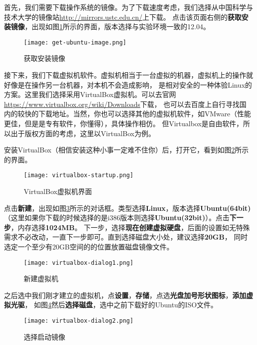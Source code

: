 首先，我们需要下载操作系统的镜像。为了下载速度考虑，我们选择从中国科学与技术大学的镜像站\url{http://mirrors.ustc.edu.cn/}上下载。
点击该页面右侧的\textbf{获取安装镜像}，出现如图\ref{fig:get-ubuntu-image}所示的界面，版本选择与实验环境一致的12.04。

\begin{figure}[htbp]
  \centering
  \texttt{[image: get-ubuntu-image.png]}
  \caption{获取安装镜像}\label{fig:get-ubuntu-image}
\end{figure}

接下来，我们下载虚拟机软件。虚拟机相当于一台虚拟的机器，虚拟机上的操作就好像是在操作另一台机器，对本机不会造成影响，
是相对安全的一种体验Linux的方案。这里我们选择采用VirtualBox虚拟机。可以去官网\url{https://www.virtualbox.org/wiki/Downloads}下载，
也可以去百度上自行寻找国内的较快的下载地址。当然，你也可以选择其他的虚拟机软件，如VMware（性能更佳，但是是专有软件，你懂得），具体操作相仿。
但Virtualbox是自由软件，所以出于版权方面的考虑，这里以VirtualBox为例。

安装VirtualBox（相信安装这种小事一定难不住你）后，打开它，看到如图\ref{fig:virtualbox-startup}所示的界面。

\begin{figure}[htbp]
  \centering
  \texttt{[image: virtualbox-startup.png]}
  \caption{VirtualBox虚拟机界面}\label{fig:virtualbox-startup}
\end{figure}

点击\textbf{新建}，出现如图\ref{fig:virtualbox-dialog1}所示的对话框。类型选择\textbf{Linux}，版本选择\textbf{Ubuntu(64bit)}
（这里如果你下载的时候选择的是i386版本则选择\textbf{Ubuntu(32bit)}）。点击\textbf{下一步}，内存选择\textbf{1024MB}。
下一步，选择\textbf{现在创建虚拟硬盘}，后面的设置如无特殊需求不必改动，一直下一步即可。直到选择磁盘大小处，建议选择\textbf{20GB}，
同时选定一个至少有20GB空间的的位置放置磁盘镜像文件。

\begin{figure}[htbp]
  \centering
  \texttt{[image: virtualbox-dialog1.png]}
  \caption{新建虚拟机}\label{fig:virtualbox-dialog1}
\end{figure}

之后选中我们刚才建立的虚拟机，点\textbf{设置}，\textbf{存储}，点选\textbf{光盘加号形状图标}，\textbf{添加虚拟光驱}，
如图\ref{fig:virtualbox-dialog2}然后\textbf{选择磁盘}，选中之前下载好的Ubuntu的ISO文件。
      
\begin{figure}[htbp]
  \centering
  \texttt{[image: virtualbox-dialog2.png]}
  \caption{选择启动镜像}\label{fig:virtualbox-dialog2}
\end{figure}

